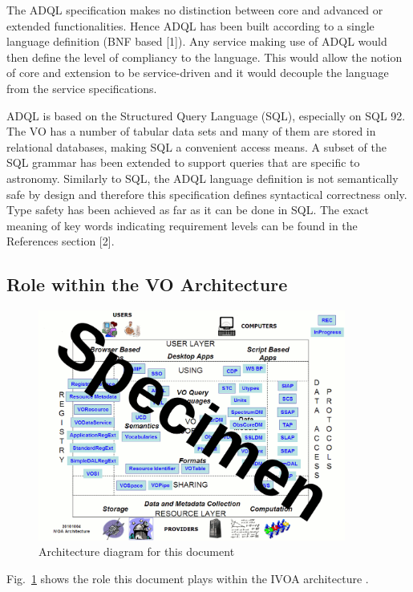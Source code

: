\documentclass[11pt,a4paper]{ivoa}
\begin{document}
The ADQL specification makes no distinction between core and advanced or
extended functionalities. Hence ADQL has been built according to a single
language definition (BNF based [1]). Any service making use of ADQL would
then define the level of compliancy to the language. This would allow the
notion of core and extension to be service-driven and it would decouple the
language from the service specifications.

ADQL is based on the Structured Query Language (SQL), especially on SQL 92. The
VO has a number of tabular data sets and many of them are stored in relational
databases, making SQL a convenient access means. A subset of the SQL grammar
has been extended to support queries that are specific to astronomy. Similarly
to SQL, the ADQL language definition is not semantically safe by design and
therefore this specification defines syntactical correctness only. Type safety
has been achieved as far as it can be done in SQL. The exact meaning of key
words indicating requirement levels can be found in the References section [2].

\clearpage
\subsection{Role within the VO Architecture}
\label{sec:role}

\begin{figure}
\centering
\includegraphics[width=0.9\textwidth]{archdiag.png}
\caption{Architecture diagram for this document}
\label{fig:archdiag}
\end{figure}

Fig.~\ref{fig:archdiag} shows the role this document plays within the
IVOA architecture \citep{note:VOARCH}.
\end{document}
